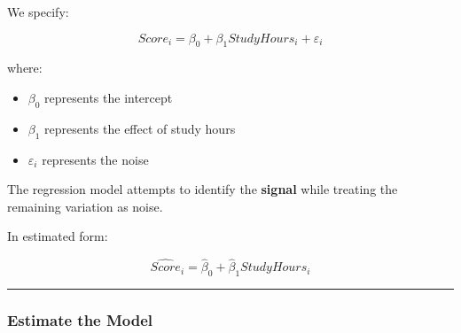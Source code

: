 \documentclass[
  a4paper,
]{article}
\providecommand{\tightlist}{%
  \setlength{\itemsep}{0pt}\setlength{\parskip}{0pt}}
\begin{document}
We specify:

\[
Score_i = \beta_0 + \beta_1 StudyHours_i + \varepsilon_i
\]

where:

\begin{itemize}
\tightlist
\item
  \(\beta_0\) represents the intercept
\item
  \(\beta_1\) represents the effect of study hours
\item
  \(\varepsilon_i\) represents the noise
\end{itemize}

The regression model attempts to identify the \textbf{signal} while
treating the remaining variation as noise.

In estimated form:

\[
\widehat{Score}_i
=
\hat{\beta}_0
+
\hat{\beta}_1 StudyHours_i
\]

\begin{center}\rule{0.5\linewidth}{0.5pt}\end{center}

\subsubsection{Estimate the Model}\label{estimate-the-model}
\end{document}
